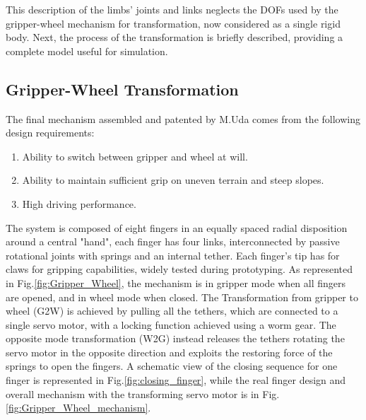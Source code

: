 This description of the limbs' joints and links neglects the DOFs used by the gripper-wheel mechanism for transformation, now considered as a single rigid body.
Next, the process of the transformation is briefly described, providing a complete model useful for simulation. 

\subsection{Gripper-Wheel Transformation}
\label{sec:gripper_wheel}

The final mechanism assembled and patented by M.Uda \cite{GrieelUda}\cite{GrieelUda} comes from the following design requirements:
\begin{enumerate}
    \setlength\itemsep{-0.7em} 
    \item Ability to switch between gripper and wheel at will.
    \item Ability to maintain sufficient grip on uneven terrain and steep slopes. 
    \item High driving performance. 
\end{enumerate}

The system is composed of eight fingers in an equally spaced radial disposition around a central "hand", each finger has four links, interconnected by passive rotational joints with springs and an internal tether. Each finger's tip has for claws for gripping capabilities, widely tested during prototyping.
As represented in Fig.\ref{fig:Gripper_Wheel}, the mechanism is in gripper mode when all fingers are opened, and in wheel mode when closed. The Transformation from gripper to wheel (G2W) is achieved by pulling all the tethers, which are connected to a single servo motor, with a locking function achieved using a worm gear. 
The opposite mode transformation (W2G) instead releases the tethers rotating the servo motor in the opposite direction and exploits the restoring force of the springs to open the fingers. A schematic view of the closing sequence for one finger is represented in Fig.\ref{fig:closing_finger}, while the real finger design and overall mechanism with the transforming servo motor is in Fig.\ref{fig:Gripper_Wheel_mechanism}.

